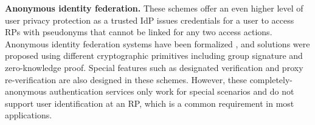 \newc
\noindent\textbf{Anonymous identity federation.}
These schemes offer an even higher level of user privacy protection as a trusted IdP issues credentials for a user to access RPs with pseudonyms that cannot be linked for any two access actions.
\oldc
Anonymous identity federation systems have been formalized \cite{WangWS13},
 and solutions \cite{WangWS13, HanCSTW18, HanCSTWW20} were proposed using different cryptographic primitives including group signature and zero-knowledge proof. Special features such as designated verification \cite{HanCSTW18} and proxy re-verification \cite{HanCSTWW20} are also designed in these schemes.
However, these completely-anonymous authentication services only work for special scenarios and do not support user identification at an RP, which is a common requirement in most applications.
